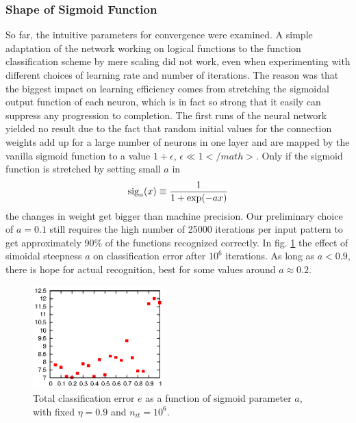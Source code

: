 \documentclass[useAMS,usenatbib]{templates/mn2e}
\begin{document}
\subsubsection{Shape of Sigmoid Function}
%
So far, the intuitive parameters for convergence were examined. A
simple adaptation of the network working on logical functions to the
function classification scheme by mere scaling did not work, even when
experimenting with different choices of learning rate and number of
iterations. The reason was that the biggest impact on learning
efficiency comes from stretching the sigmoidal output function of each
neuron, which is in fact so strong that it easily can suppress any
progression to completion. The first runs of the neural network
yielded no result due to the fact that random initial values for the
connection weights add up for a large number of neurons in one layer
and are mapped by the vanilla sigmoid function to a value
$1+\epsilon$, $\epsilon\ll1</math>$. Only if the sigmoid function is
stretched by setting small $a$ in
%
\begin{equation}
  {\rm sig}_a(x)\equiv\frac{1}{1+\exp(-ax)}
\end{equation}
%
the changes in weight get bigger than machine precision. Our
preliminary choice of $a=0.1$ still requires the high number of 25000
iterations per input pattern to get approximately 90\% of the
functions recognized correctly. In fig. \ref{fig:ea} the effect of
simoidal steepness $a$ on classification error after $10^6$
iterations. As long as $a<0.9$, there is hope for actual recognition,
best for some values around $a\approx0.2$.
\begin{figure}
  \begin{center}
    \includegraphics[width=0.45\textwidth]{fig/err/ea.eps}
  \end{center}
  \caption{\label{fig:ea}Total classification error $e$ as a function of sigmoid parameter $a$, with fixed $\eta=0.9$ and $n_{it}=10^6$.}
\end{figure}
%
\end{document}

